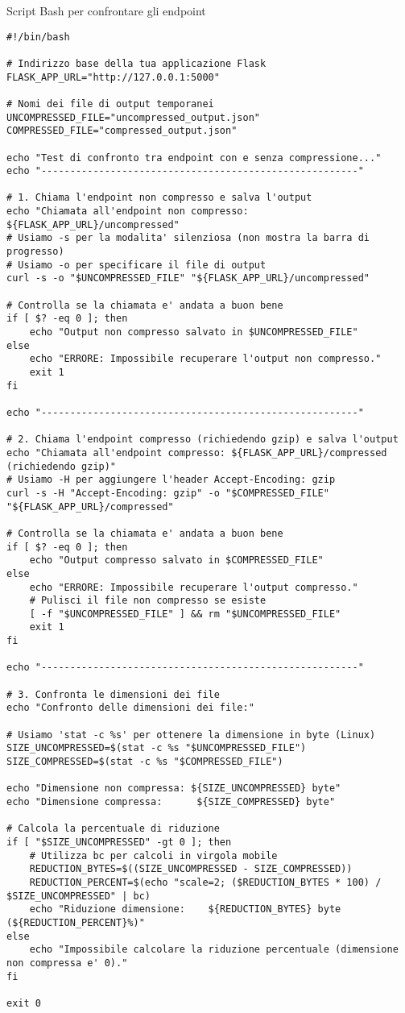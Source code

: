 \begin{longlisting}
\caption{Script Bash per confrontare gli endpoint}
\label{lst:bash_compare_endpoints}
\begin{verbatim}
#!/bin/bash

# Indirizzo base della tua applicazione Flask
FLASK_APP_URL="http://127.0.0.1:5000"

# Nomi dei file di output temporanei
UNCOMPRESSED_FILE="uncompressed_output.json"
COMPRESSED_FILE="compressed_output.json"

echo "Test di confronto tra endpoint con e senza compressione..."
echo "-------------------------------------------------------"

# 1. Chiama l'endpoint non compresso e salva l'output
echo "Chiamata all'endpoint non compresso: ${FLASK_APP_URL}/uncompressed"
# Usiamo -s per la modalita' silenziosa (non mostra la barra di progresso)
# Usiamo -o per specificare il file di output
curl -s -o "$UNCOMPRESSED_FILE" "${FLASK_APP_URL}/uncompressed"

# Controlla se la chiamata e' andata a buon bene
if [ $? -eq 0 ]; then
    echo "Output non compresso salvato in $UNCOMPRESSED_FILE"
else
    echo "ERRORE: Impossibile recuperare l'output non compresso."
    exit 1
fi

echo "-------------------------------------------------------"

# 2. Chiama l'endpoint compresso (richiedendo gzip) e salva l'output
echo "Chiamata all'endpoint compresso: ${FLASK_APP_URL}/compressed (richiedendo gzip)"
# Usiamo -H per aggiungere l'header Accept-Encoding: gzip
curl -s -H "Accept-Encoding: gzip" -o "$COMPRESSED_FILE" "${FLASK_APP_URL}/compressed"

# Controlla se la chiamata e' andata a buon bene
if [ $? -eq 0 ]; then
    echo "Output compresso salvato in $COMPRESSED_FILE"
else
    echo "ERRORE: Impossibile recuperare l'output compresso."
    # Pulisci il file non compresso se esiste
    [ -f "$UNCOMPRESSED_FILE" ] && rm "$UNCOMPRESSED_FILE"
    exit 1
fi

echo "-------------------------------------------------------"

# 3. Confronta le dimensioni dei file
echo "Confronto delle dimensioni dei file:"

# Usiamo 'stat -c %s' per ottenere la dimensione in byte (Linux)
SIZE_UNCOMPRESSED=$(stat -c %s "$UNCOMPRESSED_FILE")
SIZE_COMPRESSED=$(stat -c %s "$COMPRESSED_FILE")

echo "Dimensione non compressa: ${SIZE_UNCOMPRESSED} byte"
echo "Dimensione compressa:      ${SIZE_COMPRESSED} byte"

# Calcola la percentuale di riduzione
if [ "$SIZE_UNCOMPRESSED" -gt 0 ]; then
    # Utilizza bc per calcoli in virgola mobile
    REDUCTION_BYTES=$((SIZE_UNCOMPRESSED - SIZE_COMPRESSED))
    REDUCTION_PERCENT=$(echo "scale=2; ($REDUCTION_BYTES * 100) / $SIZE_UNCOMPRESSED" | bc)
    echo "Riduzione dimensione:    ${REDUCTION_BYTES} byte (${REDUCTION_PERCENT}%)"
else
    echo "Impossibile calcolare la riduzione percentuale (dimensione non compressa e' 0)."
fi

exit 0
\end{verbatim}
\end{longlisting}

